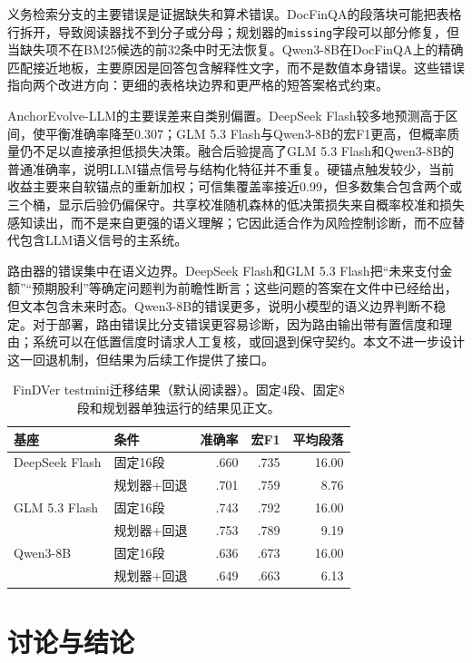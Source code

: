 义务检索分支的主要错误是证据缺失和算术错误。DocFinQA的段落块可能把表格行拆开，导致阅读器找不到分子或分母；规划器的\texttt{missing}字段可以部分修复，但当缺失项不在BM25候选的前32条中时无法恢复。Qwen3-8B在DocFinQA上的精确匹配接近地板，主要原因是回答包含解释性文字，而不是数值本身错误。这些错误指向两个改进方向：更细的表格块边界和更严格的短答案格式约束。

AnchorEvolve-LLM的主要误差来自类别偏置。DeepSeek Flash较多地预测高于区间，使平衡准确率降至0.307；GLM 5.3 Flash与Qwen3-8B的宏F1更高，但概率质量仍不足以直接承担低损失决策。融合后验提高了GLM 5.3 Flash和Qwen3-8B的普通准确率，说明LLM锚点信号与结构化特征并不重复。硬锚点触发较少，当前收益主要来自软锚点的重新加权；可信集覆盖率接近0.99，但多数集合包含两个或三个桶，显示后验仍偏保守。共享校准随机森林的低决策损失来自概率校准和损失感知读出，而不是来自更强的语义理解；它因此适合作为风险控制诊断，而不应替代包含LLM语义信号的主系统。

路由器的错误集中在语义边界。DeepSeek Flash和GLM 5.3 Flash把“未来支付金额”“预期股利”等确定问题判为前瞻性断言；这些问题的答案在文件中已经给出，但文本包含未来时态。Qwen3-8B的错误更多，说明小模型的语义边界判断不稳定。对于部署，路由错误比分支错误更容易诊断，因为路由输出带有置信度和理由；系统可以在低置信度时请求人工复核，或回退到保守契约。本文不进一步设计这一回退机制，但结果为后续工作提供了接口。

\begin{table}[H]
\centering
{}
\setlength{\tabcolsep}{4pt}
\caption{FinDVer testmini迁移结果（默认阅读器）。固定4段、固定8段和规划器单独运行的结果见正文。}
\label{tab:findver}
\begin{tabular}{llrrr}
\toprule
基座 & 条件 & 准确率 & 宏F1 & 平均段落 \\
\midrule
DeepSeek Flash & 固定16段 & .660 & .735 & 16.00 \\
 & 规划器+回退 & .701 & .759 & 8.76 \\
GLM 5.3 Flash & 固定16段 & .743 & .792 & 16.00 \\
 & 规划器+回退 & .753 & .789 & 9.19 \\
Qwen3-8B & 固定16段 & .636 & .673 & 16.00 \\
 & 规划器+回退 & .649 & .663 & 6.13 \\
\bottomrule
\end{tabular}
\end{table}

\chapter{讨论与结论}
\label{ch:conclusion}

